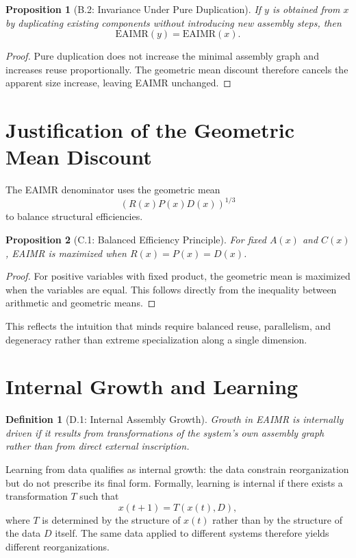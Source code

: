 \documentclass[11pt,letterpaper]{article}
\newtheorem{definition}{Definition}
\newtheorem{proposition}{Proposition}
\begin{document}
\begin{proposition}[B.2: Invariance Under Pure Duplication]
If $y$ is obtained from $x$ by duplicating existing components without introducing new assembly steps, then
\[
\mathrm{EAIMR}(y) = \mathrm{EAIMR}(x).
\]
\end{proposition}

\begin{proof}
Pure duplication does not increase the minimal assembly graph and increases reuse proportionally. The geometric mean discount therefore cancels the apparent size increase, leaving EAIMR unchanged.
\end{proof}

\section{Justification of the Geometric Mean Discount}

The EAIMR denominator uses the geometric mean
\[
\left(R(x)P(x)D(x)\right)^{1/3}
\]
to balance structural efficiencies.

\begin{proposition}[C.1: Balanced Efficiency Principle]
For fixed $A(x)$ and $C(x)$, EAIMR is maximized when $R(x)=P(x)=D(x)$.
\end{proposition}

\begin{proof}
For positive variables with fixed product, the geometric mean is maximized when the variables are equal. This follows directly from the inequality between arithmetic and geometric means.
\end{proof}

This reflects the intuition that minds require balanced reuse, parallelism, and degeneracy rather than extreme specialization along a single dimension.

\section{Internal Growth and Learning}

\begin{definition}[D.1: Internal Assembly Growth]
Growth in EAIMR is internally driven if it results from transformations of the system’s own assembly graph rather than from direct external inscription.
\end{definition}

Learning from data qualifies as internal growth: the data constrain reorganization but do not prescribe its final form. Formally, learning is internal if there exists a transformation $T$ such that
\[
x(t+1) = T(x(t),D),
\]
where $T$ is determined by the structure of $x(t)$ rather than by the structure of the data $D$ itself. The same data applied to different systems therefore yields different reorganizations.
\end{document}

